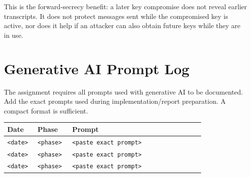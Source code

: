 \documentclass[11pt]{article}
\begin{document}
This is the forward-secrecy benefit: a later key compromise does not reveal earlier transcripts. It does not protect messages sent while the compromised key is active, nor does it help if an attacker can also obtain future keys while they are in use.

\appendix
\section{Generative AI Prompt Log}

The assignment requires all prompts used with generative AI to be documented. Add the exact prompts used during implementation/report preparation. A compact format is sufficient.

\begin{center}
\begin{tabular}{@{}p{0.14\linewidth}p{0.16\linewidth}p{0.61\linewidth}@{}}
\toprule
Date & Phase & Prompt \\
\midrule
\texttt{<date>} & \texttt{<phase>} & \texttt{<paste exact prompt>} \\
\texttt{<date>} & \texttt{<phase>} & \texttt{<paste exact prompt>} \\
\texttt{<date>} & \texttt{<phase>} & \texttt{<paste exact prompt>} \\
\bottomrule
\end{tabular}
\end{center}
\end{document}
